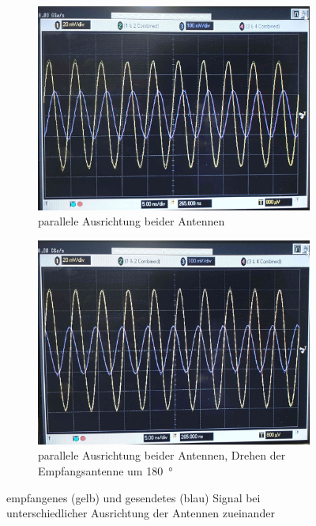 \documentclass[a4paper,twoside,final]{article}
\begin{document}
\begin{figure}[htp]
    \centering
    \begin{subfigure}{0.45\textwidth}
        \includegraphics[width=\textwidth]{Bilder/Antenne_Phasenverschiebung1.jpg}
        \caption{parallele Ausrichtung beider Antennen}
    \end{subfigure}\hspace{1cm}
    \begin{subfigure}{0.45\textwidth}
        \includegraphics[width=\textwidth]{Bilder/Antenne_Phasenverschiebung2.jpg}
        \caption{parallele Ausrichtung beider Antennen, Drehen der Empfangsantenne um \SI{180}{\degree}}
    \end{subfigure}
    \caption{empfangenes (gelb) und gesendetes (blau) Signal bei unterschiedlicher Ausrichtung der Antennen zueinander}
\end{figure}
\end{document}
